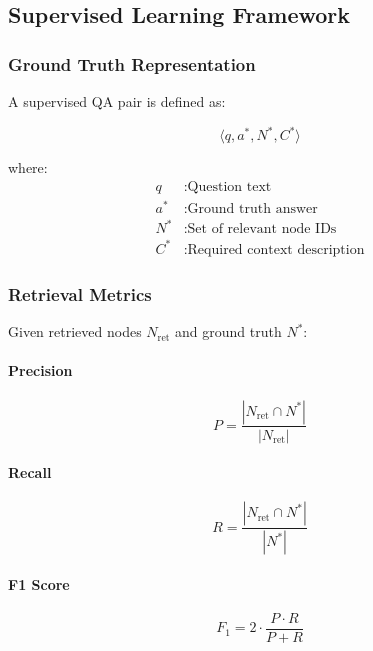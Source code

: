 \documentclass[12pt,a4paper]{article}
\begin{document}
\subsection{Supervised Learning Framework}

\subsubsection{Ground Truth Representation}

A supervised QA pair is defined as:

\begin{equation}
\langle q, a^*, N^*, C^* \rangle
\end{equation}

where:
\begin{align*}
q &: \text{Question text} \\
a^* &: \text{Ground truth answer} \\
N^* &: \text{Set of relevant node IDs} \\
C^* &: \text{Required context description}
\end{align*}

\subsubsection{Retrieval Metrics}

Given retrieved nodes $N_{\text{ret}}$ and ground truth $N^*$:

\paragraph{Precision}
\begin{equation}
P = \frac{|N_{\text{ret}} \cap N^*|}{|N_{\text{ret}}|}
\end{equation}

\paragraph{Recall}
\begin{equation}
R = \frac{|N_{\text{ret}} \cap N^*|}{|N^*|}
\end{equation}

\paragraph{F1 Score}
\begin{equation}
F_1 = 2 \cdot \frac{P \cdot R}{P + R}
\end{equation}
\end{document}
